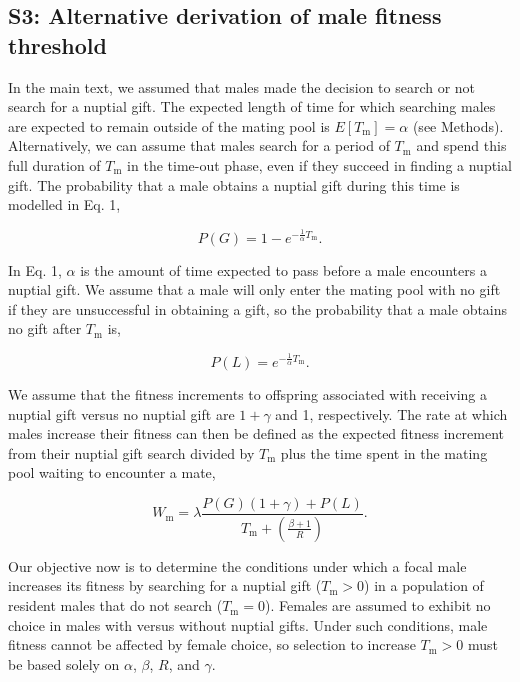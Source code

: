 \documentclass[
]{article}
\begin{document}
\captionsetup{labelformat=default}

\clearpage

\hypertarget{s3-alternative-derivation-of-male-fitness-threshold}{%
\subsection{S3: Alternative derivation of male fitness
threshold}\label{s3-alternative-derivation-of-male-fitness-threshold}}

In the main text, we assumed that males made the decision to search or
not search for a nuptial gift. The expected length of time for which
searching males are expected to remain outside of the mating pool is
\(E[T_{\mathrm{m}}] = \alpha\) (see Methods). Alternatively, we can
assume that males search for a period of \(T_{\mathrm{m}}\) and spend
this full duration of \(T_{\mathrm{m}}\) in the time-out phase, even if
they succeed in finding a nuptial gift. The probability that a male
obtains a nuptial gift during this time is modelled in Eq. 1,

\[P(G) = 1 - e^{-\frac{1}{\alpha}T_{\mathrm{m}}}.\]

In Eq. 1, \(\alpha\) is the amount of time expected to pass before a
male encounters a nuptial gift. We assume that a male will only enter
the mating pool with no gift if they are unsuccessful in obtaining a
gift, so the probability that a male obtains no gift after
\(T_{\mathrm{m}}\) is,

\[P(L) = e^{-\frac{1}{\alpha}T_{\mathrm{m}}}.\]

We assume that the fitness increments to offspring associated with
receiving a nuptial gift versus no nuptial gift are \(1 + \gamma\) and
1, respectively. The rate at which males increase their fitness can then
be defined as the expected fitness increment from their nuptial gift
search divided by \(T_{\mathrm{m}}\) plus the time spent in the mating
pool waiting to encounter a mate,

\[W_{\mathrm{m}} = \lambda \frac{P(G)\left(1 + \gamma\right) + P(L)}{T_{\mathrm{m}} + \left( \frac{\beta + 1}{R} \right)}.\]

Our objective now is to determine the conditions under which a focal
male increases its fitness by searching for a nuptial gift
(\(T_{\mathrm{m}}>0\)) in a population of resident males that do not
search (\(T_{\mathrm{m}}=0\)). Females are assumed to exhibit no choice
in males with versus without nuptial gifts. Under such conditions, male
fitness cannot be affected by female choice, so selection to increase
\(T_{\mathrm{m}}>0\) must be based solely on \(\alpha\), \(\beta\),
\(R\), and \(\gamma\).
\end{document}
